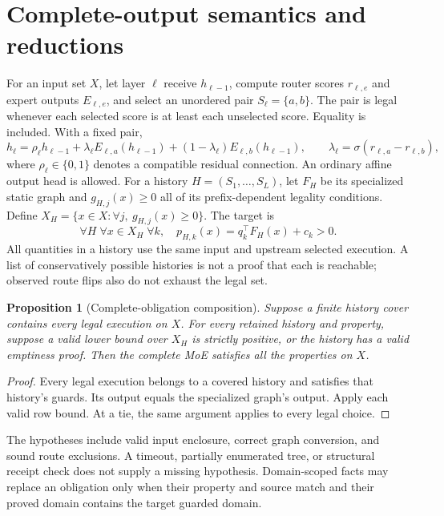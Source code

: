 \documentclass[11pt]{article}
\newtheorem{proposition}{Proposition}
\begin{document}
\section{Complete-output semantics and reductions}
For an input set $X$, let layer $\ell$ receive $h_{\ell-1}$, compute router
scores $r_{\ell,e}$ and expert outputs $E_{\ell,e}$, and select an unordered
pair $S_\ell=\{a,b\}$. The pair is legal whenever each selected score is at
least each unselected score. Equality is included. With a fixed pair,
\[
 h_\ell=\rho_\ell h_{\ell-1}
       +\lambda_\ell E_{\ell,a}(h_{\ell-1})
       +(1-\lambda_\ell)E_{\ell,b}(h_{\ell-1}),\qquad
 \lambda_\ell=\sigma(r_{\ell,a}-r_{\ell,b}),
\]
where $\rho_\ell\in\{0,1\}$ denotes a compatible residual connection. An
ordinary affine output head is allowed. For a history $H=(S_1,\ldots,S_L)$,
let $F_H$ be its specialized static graph and $g_{H,j}(x)\geq0$ all of its
prefix-dependent legality conditions. Define
$X_H=\{x\in X:\forall j,\ g_{H,j}(x)\geq0\}$.
The target is
\[
 \forall H\;\forall x\in X_H\;\forall k,\quad
 p_{H,k}(x)=q_k^\top F_H(x)+c_k>0.
\]
All quantities in a history use the same input and upstream selected execution.
A list of conservatively possible histories is not a proof that each is
reachable; observed route flips also do not exhaust the legal set.

\begin{proposition}[Complete-obligation composition]
Suppose a finite history cover contains every legal execution on $X$.
For every retained history and property, suppose a valid lower bound over
$X_H$ is strictly positive, or the history has a valid emptiness proof.
Then the complete MoE satisfies all the properties on $X$.
\end{proposition}
\begin{proof}
Every legal execution belongs to a covered history and satisfies that history's
guards. Its output equals the specialized graph's output. Apply each valid
row bound. At a tie, the same argument applies to every legal choice.
\end{proof}
The hypotheses include valid input enclosure, correct graph conversion, and
sound route exclusions. A timeout, partially enumerated tree, or structural
receipt check does not supply a missing hypothesis. Domain-scoped facts may
replace an obligation only when their property and source match and their
proved domain contains the target guarded domain.
\end{document}
